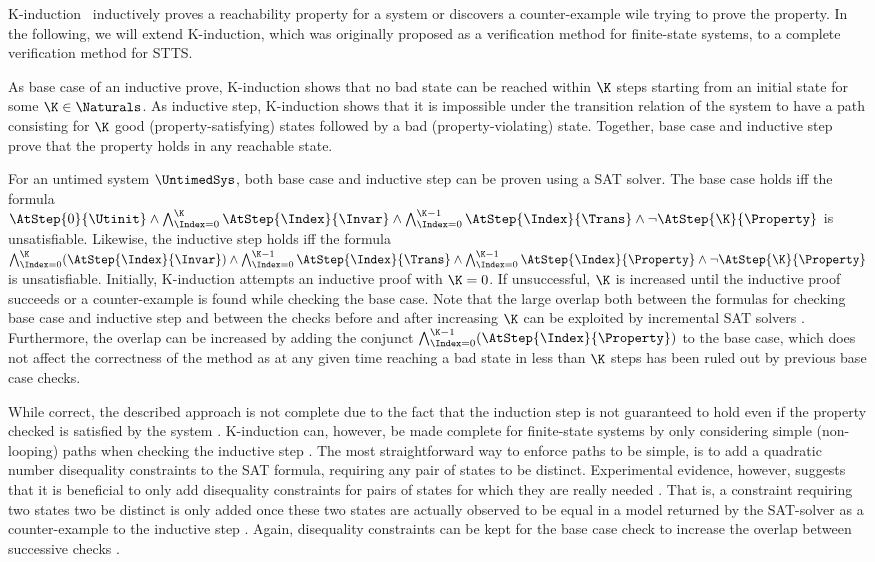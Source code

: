 \iffalse K-induction \tocite\ inductively proves a reachability property for a system or discovers a counter-example wile trying to prove the property. In the following, we will extend K-induction, which was originally proposed as a verification method for finite-state systems, to a complete verification method for STTS.

As base case of an inductive prove, K-induction shows that no bad state can be reached within $\K$ steps starting from an initial state for some $\K \in \Naturals$. As inductive step, K-induction shows that it is impossible under the transition relation of the system to have a path consisting for $\K$ good (property-satisfying) states followed by a bad (property-violating) state. Together, base case and inductive step prove that the property holds in any reachable state.

For an untimed system $\UntimedSys$, both base case and inductive step can be proven using a SAT solver. The base case holds iff the formula
$\AtStep{0}{\Utinit}
\wedge \bigwedge_{\Index = 0}^{\K} \AtStep{\Index}{\Invar}
\wedge \bigwedge_{\Index = 0}^{\K-1}\AtStep{\Index}{\Trans}
\wedge \neg\AtStep{\K}{\Property}$
is unsatisfiable. Likewise, the inductive step holds iff the formula
$\bigwedge_{\Index = 0}^{\K} (\AtStep{\Index}{\Invar})
\wedge \bigwedge_{\Index = 0}^{\K-1}\AtStep{\Index}{\Trans}
\wedge \bigwedge_{\Index = 0}^{\K-1}\AtStep{\Index}{\Property}
\wedge \neg\AtStep{\K}{\Property}$
is unsatisfiable.
Initially, K-induction attempts an inductive proof with $\K=0$. If unsuccessful, $\K$ is increased until the inductive proof succeeds or a counter-example is found while checking the base case.
Note that the large overlap both between the formulas for checking base case and inductive step and between the checks before and after increasing $\K$ can be exploited by incremental SAT solvers \tocite.
 Furthermore, the overlap can be increased by adding the conjunct $\bigwedge_{\Index = 0}^{\K-1}(\AtStep{\Index}{\Property})$ to the base case, which does not affect the correctness of the method as at any given time reaching a bad state in less than $\K$ steps has been ruled out by previous base case checks.


While correct, the described approach is not complete due to the fact that the induction step is not guaranteed to hold even if the property checked is satisfied by the system \tocite. K-induction can, however, be made complete for finite-state systems by only considering simple (non-looping) paths when checking the inductive step \tocite.
The most straightforward way to enforce paths to be simple, is to add a quadratic number disequality constraints to the SAT formula, requiring any pair of states to be distinct. Experimental evidence, however, suggests that it is beneficial to only add disequality constraints for pairs of states for which they are really needed \tocite. That is, a constraint requiring two states two be distinct is only added once these two states are actually observed to be equal in a model returned by the SAT-solver as a counter-example to the inductive step \tocite.
Again, disequality constraints can be kept for the base case check to increase the overlap between successive checks \tocite .

